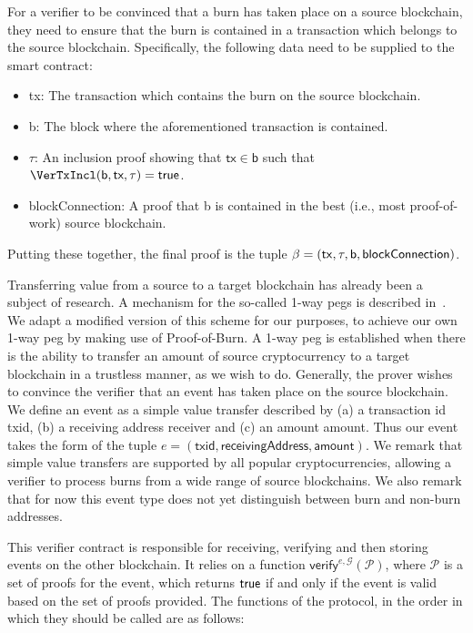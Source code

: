 For a verifier to be convinced that a burn has taken place on a source blockchain, they need to ensure that the burn is contained in a transaction which belongs to the source blockchain. Specifically, the following data need to be supplied to the smart contract:

\begin{itemize}
  \item \textsf{tx}: The transaction which contains the burn on the source blockchain.
  \item \textsf{b}: The block where the aforementioned transaction is contained.
  \item $\tau$: An inclusion proof showing that $\mathsf{tx} \in \mathsf{b}$ such that $\VerTxIncl(\textsf{b}, \textsf{tx}, \tau) = \true$.
  \item \textsf{blockConnection}: A proof that \textsf{b} is contained in the best (i.e., most proof-of-work) source blockchain.
\end{itemize}

Putting these together, the final proof is the tuple $\beta = \sf(tx, \tau, b, blockConnection)$.

Transferring value from a source to a target blockchain has already been a subject of research. A mechanism for the so-called 1-way pegs is described in~\cite{pow-sidechains}. We adapt a modified version of this scheme for our purposes, to achieve our own 1-way peg by making use of Proof-of-Burn. A 1-way peg is established when there is the ability to transfer an amount of source cryptocurrency to a target blockchain in a trustless manner, as we wish to do. Generally, the prover wishes to convince the verifier that an event has taken place on the source blockchain. We define an event as a simple value transfer described by (a) a transaction id \textsf{txid}, (b) a receiving address \textsf{receiver} and (c) an amount \textsf{amount}. Thus our event takes the form of the tuple $e = (\textsf{txid}, \textsf{receivingAddress}, \textsf{amount})$. We remark that simple value transfers are supported by all popular cryptocurrencies, allowing a verifier to process burns from a wide range of source blockchains. We also remark that for now this event type does not yet distinguish between burn and non-burn addresses.

This verifier contract is responsible for receiving, verifying and then storing events on the other blockchain. It relies on a function $\mathsf{verify}^{e,\mathcal{G}}(\mathcal{P})$, where $\mathcal{P}$ is a set of proofs for the event, which returns $\mathsf{true}$ if and only if the event is valid based on the set of proofs provided. The functions of the protocol, in the order in which they should be called are as follows:

